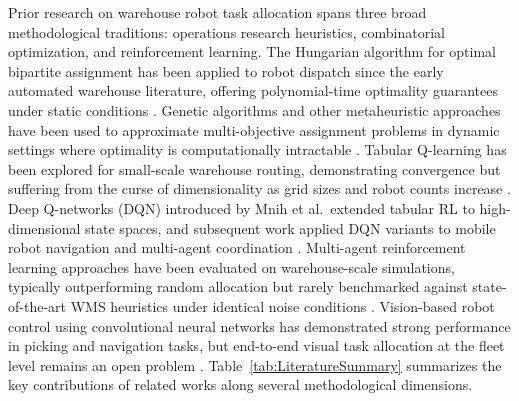 \documentclass[conference]{IEEEtran}
\begin{document}
Prior research on warehouse robot task allocation spans three broad methodological traditions: operations research heuristics, combinatorial optimization, and reinforcement learning.
The Hungarian algorithm for optimal bipartite assignment has been applied to robot dispatch since the early automated warehouse literature, offering polynomial-time optimality guarantees under static conditions \cite{burkard2009assignment}.
Genetic algorithms and other metaheuristic approaches have been used to approximate multi-objective assignment problems in dynamic settings where optimality is computationally intractable \cite{xin2017automated}.
Tabular Q-learning has been explored for small-scale warehouse routing, demonstrating convergence but suffering from the curse of dimensionality as grid sizes and robot counts increase \cite{zhang2021robot}.
Deep Q-networks (DQN) introduced by Mnih et al.\ extended tabular RL to high-dimensional state spaces, and subsequent work applied DQN variants to mobile robot navigation and multi-agent coordination \cite{mnih2015human}.
Multi-agent reinforcement learning approaches have been evaluated on warehouse-scale simulations, typically outperforming random allocation but rarely benchmarked against state-of-the-art WMS heuristics under identical noise conditions \cite{li2021reinforcement}.
Vision-based robot control using convolutional neural networks has demonstrated strong performance in picking and navigation tasks, but end-to-end visual task allocation at the fleet level remains an open problem \cite{zeng2020transporter}.
Table~\ref{tab:LiteratureSummary} summarizes the key contributions of related works along several methodological dimensions.
\end{document}
